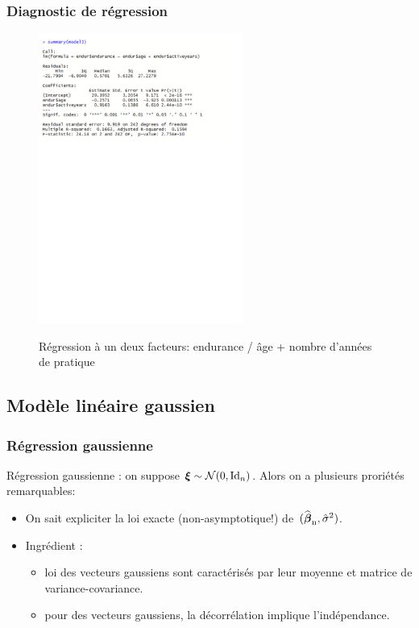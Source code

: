 \begin{frame}
\frametitle{Diagnostic de régression}
\begin{figure}
  \centering
  \includegraphics[width=0.6\textwidth]{summarymodel3}\\
  \caption{Régression à un deux facteurs: endurance / âge + nombre d'années de pratique}
\end{figure}
\end{frame}








\subsection{Modèle linéaire gaussien}

\begin{frame}
\frametitle{Régression gaussienne} \alert{Régression gaussienne} : on
suppose $\boldsymbol{\xi} \sim {\mathcal N}(0,\mathrm{Id}_{n})$. Alors on a plusieurs proriétés
remarquables:
\begin{itemize}
\item  On sait expliciter la loi \alert{ exacte} (non-asymptotique!)
de~$(\operatorname{\widehat{\boldsymbol{\beta}}_n},\hat{\sigma}^2)$.\\\vspace{1mm}
\item \alert{Ingrédient} :
\begin{itemize}
\item loi des vecteurs gaussiens sont caractérisés par leur moyenne et matrice de
variance-covariance.
\item pour des vecteurs gaussiens, la décorrélation implique l'indépendance.
\end{itemize}
\end{itemize}
\end{frame}

